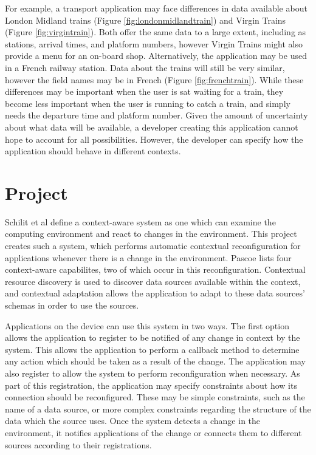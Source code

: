 \documentclass[12pt,twoside,notitlepage]{report}
\begin{document}
For example, a transport application may face differences in data available about London Midland trains (Figure \ref{fig:londonmidlandtrain}) and Virgin Trains (Figure \ref{fig:virgintrain}). 
Both offer the same data to a large extent, including as stations, arrival times, and platform numbers, however Virgin Trains might also provide a menu for an on-board shop. 
Alternatively, the application may be used in a French railway station. 
Data about the trains will still be very similar, however the field names may be in French (Figure \ref{fig:frenchtrain}). 
While these differences may be important when the user is sat waiting for a train, they become less important when the user is running to catch a train, and simply needs the departure time and platform number.
Given the amount of uncertainty about what data will be available, a developer creating this application cannot hope to account for all possibilities. 
However, the developer can specify how the application should behave in different contexts.

\section{Project}

Schilit et al \cite{Schilit:1994:CCA:1439278.1440041}  define a context-aware system as one which can examine the computing environment and react to changes in the environment. 
This project creates such a system, which performs automatic contextual reconfiguration for applications whenever there is a change in the environment. 
Pascoe \cite{Pascoe:1998:AGC:857199.858020} lists four context-aware capabilites, two of which occur in this reconfiguration. 
Contextual resource discovery is used to discover data sources available within the context, and contextual adaptation allows the application to adapt to these data sources' schemas in order to use the sources.

Applications on the device can use this system in two ways. 
The first option allows the application to register to be notified of any change in context by the system. 
This allows the application to perform a callback method to determine any action which should be taken as a result of the change. 
The application may also register to allow the system to perform reconfiguration when necessary. 
As part of this registration, the application may specify constraints about how its connection should be reconfigured. 
These may be simple constraints, such as the name of a data source, or more complex constraints regarding the structure of the data which the source uses. 
Once the system detects a change in the environment, it notifies applications of the change or connects them to different sources according to their registrations.
\end{document}
